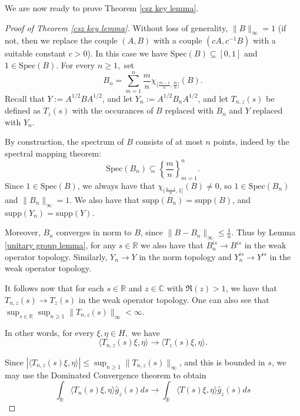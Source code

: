     We are now ready to prove Theorem \ref{csz key lemma}.
    \begin{proof}[Proof of Theorem \ref{csz key lemma}] 
        Without loss of generality, $\|B\|_{\infty}=1$ (if not, then we replace the couple $(A,B)$ with a couple $(cA,c^{-1}B)$ with a suitable constant $c > 0$). 
        In this case we have $\mathrm{Spec}(B) \subseteq [0,1]$ and $1 \in \mathrm{Spec}(B)$.
        For every $n\geq 1 ,$ set
        $$B_n=\sum_{m=1}^n\frac{m}{n}\chi_{(\frac{m-1}{n},\frac{m}{n}]}(B).$$
        Recall that $Y := A^{1/2}BA^{1/2}$, and let $Y_n := A^{1/2}B_nA^{1/2}$, and let $T_{n,z}(s)$ be defined as $T_z(s)$
        with the occurances of $B$ replaced with $B_n$ and $Y$ replaced with $Y_n$.
        
        By construction, the spectrum of $B$ consists of at most $n$ points, indeed by the spectral mapping theorem:
        \begin{equation*}
            \mathrm{Spec}(B_n) \subseteq \left\{\frac{m}{n}\right\}_{m=1}^n.
        \end{equation*}        
        Since $1 \in \mathrm{Spec}(B)$, we always have that $\chi_{(\frac{n-1}{n},1]}(B) \neq 0$, so $1 \in \mathrm{Spec}(B_n)$
        and $\|B_n\|_\infty = 1$.
        We also have that $\mathrm{supp}(B_n) = \mathrm{supp}(B)$, and $\mathrm{supp}(Y_n) = \mathrm{supp}(Y)$. 
        
        Moreover, $B_n$ converges in norm to $B$, since $\|B-B_n\|_\infty \leq \frac{1}{n}$. Thus by Lemma \ref{unitary group lemma}, 
        for any $s \in \mathbb{R}$ we also have that $B_n^{is}\to B^{is}$ in the weak operator topology. Similarly, $Y_n\to Y$ in the norm topology
        and $Y_n^{is}\to Y^{is}$ in the weak operator topology. 
        
        It follows now that for each $s \in \mathbb{R}$ and $z \in \mathbb{C}$ with $\Re(z) > 1$, we have that $T_{n,z}(s)\to T_z(s)$ in the weak operator topology. One can also see that $\sup_{s \in \mathbb{R}} \sup_{n\geq 1} \|T_{n,z}(s)\|_\infty < \infty$.
        
        In other words, for every $\xi,\eta\in H,$ we have
        $$\langle T_{n,z}(s)\xi,\eta\rangle\to\langle T_z(s)\xi,\eta\rangle.$$      
        
        Since $|\langle T_{n,z}(s)\xi,\eta\rangle| \leq \sup_{n\geq 1} \|T_{n,z}(s)\|_\infty$, and this is bounded in $s$, we may use the Dominated Convergence theorem
        to obtain
        $$\int_{\mathbb{R}}\langle T_n(s)\xi,\eta\rangle \widehat{g}_z(s)ds\to \int_{\mathbb{R}}\langle T(s)\xi,\eta\rangle \widehat{g}_z(s)ds$$
        

\end{proof}
